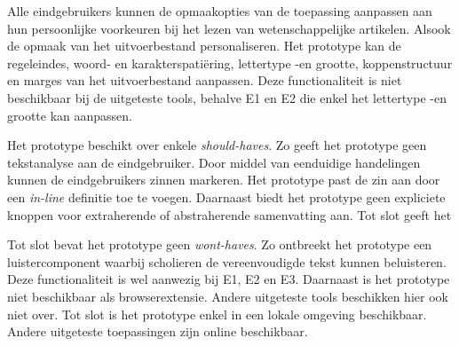 \medspace

Alle eindgebruikers kunnen de opmaakopties van de toepassing aanpassen aan hun persoonlijke voorkeuren bij het lezen van wetenschappelijke artikelen. Alsook de opmaak van het uitvoerbestand personaliseren. Het prototype kan de regeleindes, woord- en karakterspatiëring, lettertype -en grootte, koppenstructuur en marges van het uitvoerbestand aanpassen. Deze functionaliteit is niet beschikbaar bij de uitgeteste tools, behalve E1 en E2 die enkel het lettertype -en grootte kan aanpassen. 

\medspace

Het prototype beschikt over enkele \textit{should-haves}. Zo geeft het prototype geen tekstanalyse aan de eindgebruiker. Door middel van eenduidige handelingen kunnen de eindgebruikers zinnen markeren. Het prototype past de zin aan door een \textit{in-line} definitie toe te voegen. Daarnaast biedt het prototype geen expliciete knoppen voor extraherende of abstraherende samenvatting aan. Tot slot geeft het 

\medspace

Tot slot bevat het prototype geen \textit{wont-haves}. Zo ontbreekt het prototype een luistercomponent waarbij scholieren de vereenvoudigde tekst kunnen beluisteren. Deze functionaliteit is wel aanwezig bij E1, E2 en E3. Daarnaast is het prototype niet beschikbaar als browserextensie. Andere uitgeteste tools beschikken hier ook niet over. Tot slot is het prototype enkel in een lokale omgeving beschikbaar. Andere uitgeteste toepassingen zijn online beschikbaar. 


